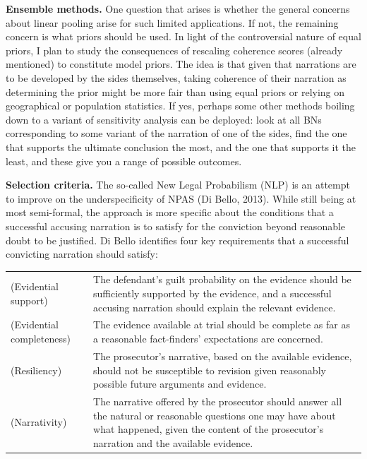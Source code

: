 \documentclass[11pt,dvipsnames,enabledeprecatedfontcommands]{scrartcl}
\begin{document}
\noindent
\textbf{Ensemble methods.} One question that arises is whether the
general concerns about linear pooling arise for such limited
applications. If not, the remaining concern is what priors should be
used. In light of the controversial nature of equal priors, I plan to
study the consequences of rescaling coherence scores (already mentioned)
to constitute model priors. The idea is that given that narrations are
to be developed by the sides themselves, taking coherence of their
narration as determining the prior might be more fair than using equal
priors or relying on geographical or population statistics. If yes,
perhaps some other methods boiling down to a variant of sensitivity
analysis can be deployed: look at all BNs corresponding to some variant
of the narration of one of the sides, find the one that supports the
ultimate conclusion the most, and the one that supports it the least,
and these give you a range of possible outcomes.

\noindent
 \textbf{Selection criteria.} The so-called New Legal Probabilism (NLP)
is an attempt to improve on the underspecificity of NPAS (Di Bello,
2013). While still being at most semi-formal, the approach is more
specific about the conditions that a successful accusing narration is to
satisfy for the conviction beyond reasonable doubt to be justified. Di
Bello identifies four key requirements that a successful convicting
narration should satisfy:

\vspace{2mm}

\begin{center}
\begin{tabular}{@{}lp{11.5cm}@{}}
\toprule
 (Evidential support) &The defendant's guilt probability on the evidence should be sufficiently supported by the evidence, and a successful accusing narration should explain the relevant evidence. \\
(Evidential completeness) &  The evidence available at trial should be complete as far as a reasonable fact-finders' expectations are concerned. \\
(Resiliency)&  The prosecutor's narrative, based on the available evidence, should not be susceptible to revision given reasonably possible future arguments and evidence. \\
(Narrativity) & The narrative offered by the prosecutor should answer all 
the natural or reasonable questions one may have about what happened, given the content of the prosecutor's narration and the available evidence. \\
\bottomrule
\end{tabular}
\end{center}
\end{document}
